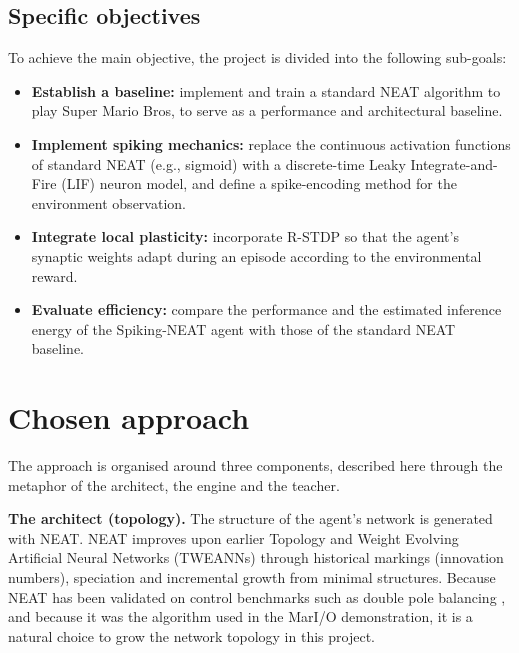 \subsection{Specific objectives}
To achieve the main objective, the project is divided into the following sub-goals:
\begin{itemize}
    \item \textbf{Establish a baseline:} implement and train a standard NEAT algorithm to play Super Mario Bros, to serve as a performance and architectural baseline.
    \item \textbf{Implement spiking mechanics:} replace the continuous activation functions of standard NEAT (e.g., sigmoid) with a discrete-time Leaky Integrate-and-Fire (LIF) \cite{gerstner2014} neuron model, and define a spike-encoding method for the environment observation.
    \item \textbf{Integrate local plasticity:} incorporate R-STDP so that the agent's synaptic weights adapt during an episode according to the environmental reward.
    \item \textbf{Evaluate efficiency:} compare the performance and the estimated inference energy of the Spiking-NEAT agent with those of the standard NEAT baseline.
\end{itemize}

\section{Chosen approach}
The approach is organised around three components, described here through the metaphor of the architect, the engine and the teacher.

\textbf{The architect (topology).} The structure of the agent's network is generated with NEAT. NEAT improves upon earlier Topology and Weight Evolving Artificial Neural Networks (TWEANNs) through historical markings (innovation numbers), speciation and incremental growth from minimal structures. Because NEAT has been validated on control benchmarks such as double pole balancing \cite{stanley2002}, and because it was the algorithm used in the MarI/O demonstration, it is a natural choice to grow the network topology in this project.


